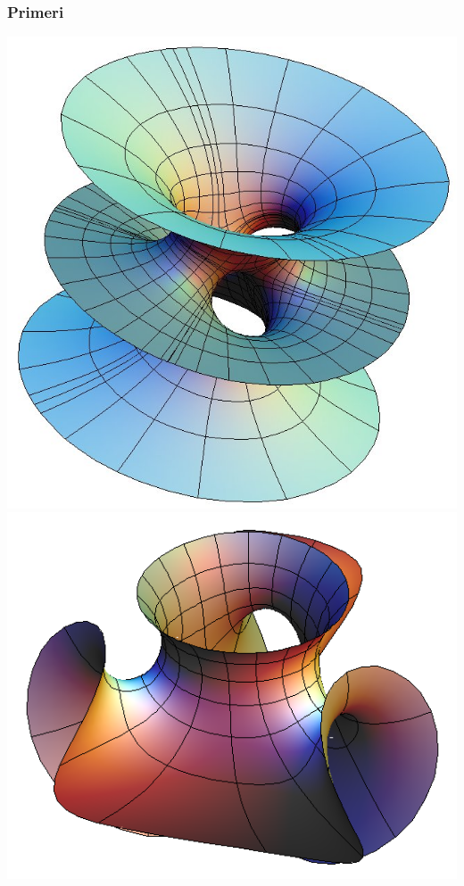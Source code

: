 \documentclass[9pt, table]{beamer}
\begin{document}
\begin{frame}
\frametitle{Primeri}


\includegraphics[scale=0.2]{costa.jpg}
\includegraphics[scale=0.3]{catenoid-enneper.png}


\end{frame}
\end{document}
